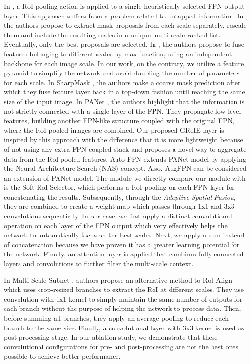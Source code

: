 \documentclass[10pt,conference,a4paper]{IEEEtran}
\begin{document}
In \cite{lin2017feature}, a RoI pooling action is applied to a single heuristically-selected FPN output layer. This approach suffers from a problem related to untapped information.
In \cite{pont2016multiscale}, the authors propose to extract mask proposals from each scale separately, rescale them and include the resulting scales in a unique multi-scale ranked list. Eventually, only the best proposals are selected.
In \cite{ren2016object}, the authors propose to fuse features belonging to different scales by max function, using an independent backbone for each image scale. In our work, on the contrary, we utilize a feature pyramid to simplify the network and avoid doubling the number of parameters for each scale.
In SharpMask \cite{pinheiro2016learning}, the authors make a coarse mask prediction after which they fuse feature layer back in a top-down fashion until reaching the same size of the input image.
In PANet \cite{liu2018path}, the authors highlight that the information is not strictly connected with a single layer of the FPN.
They propagate low-level features, building another FPN-like structure coupled with the original FPN, where the RoI-pooled images are combined.
Our proposed GRoIE layer is inspired by this approach with the difference that it is more lightweight because of not using any extra FPN-coupled stack and proposes a novel way to aggregate data from the RoI-pooled features.
Auto-FPN \cite{xu2019auto} extends PANet model by applying the Neural Architecture Search (NAS) concept.
Also, AugFPN \cite{guo2019augfpn} can be considered an extension of PANet model.
The module we directly compare our module with is the Soft RoI Selector, which performs a RoI pooling on each FPN layer for concatenating the results.
Subsequently, through the \emph{Adaptive Spatial Fusion}, they are combined to create a weight map which passes through 1x1 and 3x3 convolutions sequentially.
In our case, we first apply a distinct convolutional operation on each layer of the FPN output which very effectively helps the network to automatically focus on the best scales.
Next, we apply a sum instead of concatenation because we have proven it has a greater learning potential for the network.
Finally, an attention layer is applied that combines fully-connected layers and convolutions to further filter the multi-scale context.

In Multi-Scale Subnet \cite{linh2018multi}, authors propose an alternative method to RoI Align which uses crop-resized branches to extract the RoI at different scales.
They use convolution with 1x1 kernel to simply maintain the same number of outputs for each branch without the purpose of helping the network to process data.
Then, before summing all branches, they apply an average pooling to reduce each branch to the same size.
Finally, a convolutional layer with 3x3 kernel is used as post-processing stage.
In our ablation study, we demonstrate that these convolutional configurations for pre- and post-processing are not the best ones possible to achieve better performance.
\end{document}
